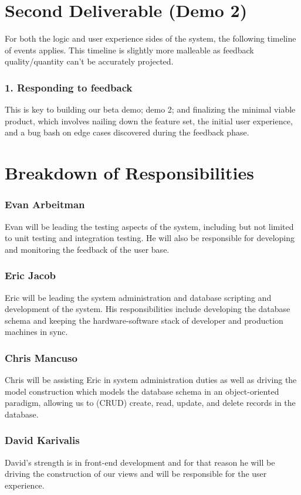 \section{Second Deliverable (Demo 2)}
For both the logic and user experience sides of the system, the following
timeline of events applies. This timeline is slightly more malleable as
feedback quality/quantity can’t be accurately projected. \\

\subsubsection{1. Responding to feedback}
This is key to building our beta demo; demo 2; and finalizing the minimal viable
product, which involves nailing down the feature set, the initial user experience,
and a bug bash on edge cases discovered during the feedback phase.\\

\section{Breakdown of Responsibilities}
\subsubsection{Evan Arbeitman}
Evan will be leading the testing aspects of the system, including but not
limited to unit testing and integration testing. He will also be responsible
for developing and monitoring the feedback of the user base.\\
\subsubsection{Eric Jacob}
Eric will be leading the system administration and database scripting and
development of the system.  His responsibilities include developing the database
schema and keeping the hardware-software stack of developer and production
machines in sync.
\subsubsection{Chris Mancuso}
Chris will be assisting Eric in system administration duties as well as driving
the model construction which models the database schema in an object-oriented
paradigm, allowing us to (CRUD) create, read, update, and delete records in the
database.
\subsubsection{David Karivalis}
David's strength is in front-end development and for that reason he will be
driving the construction of our views and will be responsible for the user
experience.
